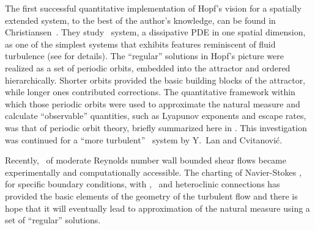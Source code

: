 The first successful quantitative implementation of Hopf's
vision for a spatially extended system, to the best of the
author's knowledge, can be found in
Christiansen~\etal{}. They study \KS\ system,
a dissipative PDE in one spatial dimension, as one of the
simplest systems that exhibits features reminiscent of fluid
turbulence (see  for details). The ``regular''
solutions in Hopf's picture were realized as a set of periodic
orbits, embedded into the attractor and ordered hierarchically.
Shorter orbits provided the basic building blocks of the
attractor, while longer ones contributed corrections. The
quantitative framework within which those periodic orbits were
used to approximate the natural measure and calculate
``observable'' quantities, such as Lyapunov exponents and
escape rates, was that of periodic orbit theory,
briefly summarized here in . This
investigation was continued for a ``more turbulent'' \KS\
system by Y.~Lan and Cvitanovi\'c.

Recently, \statesp\ of moderate Reynolds number wall bounded
shear flows became experimentally and
computationally
accessible. The charting of Navier-Stokes \statesp, for
specific boundary conditions, with \eqva, \reqva\
and heteroclinic connections has provided the basic elements of
the geometry of the turbulent flow and there is hope that it
will eventually lead to approximation of the natural measure
using a set of ``regular'' solutions.
